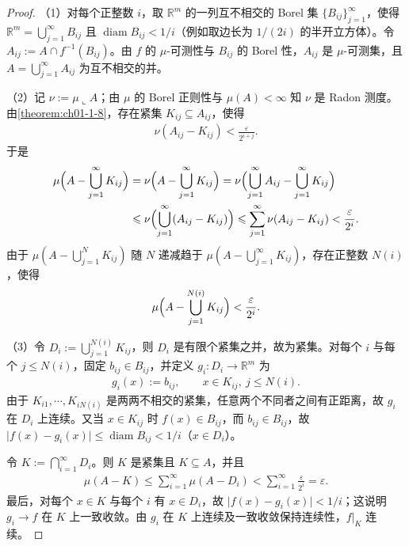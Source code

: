 \documentclass[../../main.tex]{subfiles}%
\begin{document}
\begin{proof}
（1）对每个正整数 $i$，取 $\mathbb{R}^m$ 的一列互不相交的 Borel 集 $\{B_{ij}\}_{j=1}^{\infty}$，使得 $\mathbb{R}^m=\bigcup_{j=1}^{\infty}B_{ij}$ 且 $\operatorname{diam}B_{ij}<1/i$（例如取边长为 $1/(2i)$ 的半开立方体）。令 $A_{ij}:=A\cap f^{-1}(B_{ij})$。由 $f$ 的 $\mu$-可测性与 $B_{ij}$ 的 Borel 性，$A_{ij}$ 是 $\mu$-可测集，且 $A=\bigcup_{j=1}^{\infty}A_{ij}$ 为互不相交的并。

（2）记 $\nu:=\mu\llcorner A$；由 $\mu$ 的 Borel 正则性与 $\mu(A)<\infty$ 知 $\nu$ 是 Radon 测度。由\cref{theorem:ch01-1-8}，存在紧集 $K_{ij}\subseteq A_{ij}$，使得%
\begin{align*}
\nu(A_{ij}-K_{ij})<\frac{\varepsilon}{2^{i+j}}.
\end{align*}
于是
\begin{align*}
\mu\Bigl(A-\bigcup_{j=1}^{\infty}K_{ij}\Bigr)
&=\nu\Bigl(A-\bigcup_{j=1}^{\infty}K_{ij}\Bigr)
=\nu\Bigl(\bigcup_{j=1}^{\infty}A_{ij}-\bigcup_{j=1}^{\infty}K_{ij}\Bigr)\\
&\leqslant\nu\Bigl(\bigcup_{j=1}^{\infty}(A_{ij}-K_{ij})\Bigr)
\leqslant\sum_{j=1}^{\infty}\nu(A_{ij}-K_{ij})<\frac{\varepsilon}{2^{i}}.
\end{align*}
由于 $\mu(A-\bigcup_{j=1}^{N}K_{ij})$ 随 $N$ 递减趋于 $\mu(A-\bigcup_{j=1}^{\infty}K_{ij})$，存在正整数 $N(i)$，使得
\begin{align*}
\mu\Bigl(A-\bigcup_{j=1}^{N(i)}K_{ij}\Bigr)<\frac{\varepsilon}{2^{i}}.
\end{align*}

（3）令 $D_i:=\bigcup_{j=1}^{N(i)}K_{ij}$，则 $D_i$ 是有限个紧集之并，故为紧集。对每个 $i$ 与每个 $j\leqslant N(i)$，固定 $b_{ij}\in B_{ij}$，并定义 $g_i:D_i\to\mathbb{R}^m$ 为
\begin{align*}
g_i(x):=b_{ij},\qquad x\in K_{ij},\ j\leqslant N(i).
\end{align*}
由于 $K_{i1},\cdots,K_{iN(i)}$ 是两两不相交的紧集，任意两个不同者之间有正距离，故 $g_i$ 在 $D_i$ 上连续。又当 $x\in K_{ij}$ 时 $f(x)\in B_{ij}$，而 $b_{ij}\in B_{ij}$，故 $\lvert f(x)-g_i(x)\rvert\leqslant\operatorname{diam}B_{ij}<1/i$（$x\in D_i$）。

令 $K:=\bigcap_{i=1}^{\infty}D_i$。则 $K$ 是紧集且 $K\subseteq A$，并且
\begin{align*}
\mu(A-K)\leqslant\sum_{i=1}^{\infty}\mu(A-D_i)<\sum_{i=1}^{\infty}\frac{\varepsilon}{2^{i}}=\varepsilon.
\end{align*}
最后，对每个 $x\in K$ 与每个 $i$ 有 $x\in D_i$，故 $\lvert f(x)-g_i(x)\rvert<1/i$；这说明 $g_i\to f$ 在 $K$ 上一致收敛。由 $g_i$ 在 $K$ 上连续及一致收敛保持连续性，$f|_K$ 连续。
\end{proof}
\end{document}

